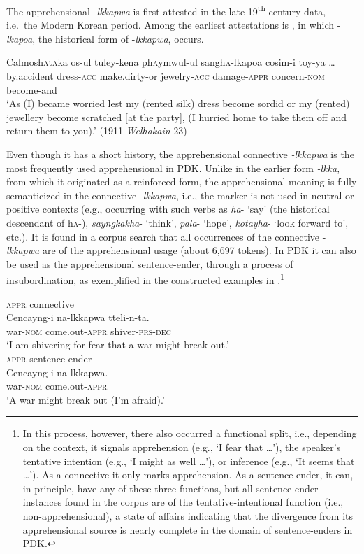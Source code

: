 \documentclass[output=paper,colorlinks,citecolor=brown]{langscibook}
\begin{document}
The apprehensional \textit{-lkkapwa} is first attested in the late 19\textsuperscript{th} century data, i.e.\  the Modern Korean period. Among the earliest attestations is , in which \nobreakdash-\textit{lkapoa}, the historical form of \nobreakdash-\textit{lkkapwa}, occurs.


\ea \label{ex:RK5}
\gll Calmosh\textsc{a}t\textsc{a}ka os-ul tuley-kena ph\textsc{a}ymwul-ul sangh\textsc{a}-lkapoa cosim-i toy-ya … \\
by.accident dress-\textsc{acc} make.dirty-or jewelry-\textsc{acc} damage-\textsc{appr} concern-\textsc{nom} become-and \\
\glt `As (I) became worried lest my (rented silk) dress become sordid or my (rented) jewellery become scratched [at the party], (I hurried home to take them off and return them to you).' (1911 \textit{Welhakain} 23)
\z


\noindent Even though it has a short history, the apprehensional connective \textit{-lkkapwa} is the most frequently used apprehensional in PDK. Unlike in the earlier form \textit{\nobreakdash-lkka}, from which it originated as a reinforced form, the apprehensional meaning is fully semanticized in the connective \nobreakdash-\textit{lkkapwa}, i.e., the marker is not used in neutral or positive contexts (e.g., occurring with such verbs as \textit{ha}- `say' (the historical descendant of h\textsc{a}-), \textit{sayngkakha}- `think', \textit{pala}- `hope', \textit{kotayha}- `look forward to', etc.). It is found in a corpus search that all occurrences of the connective \nobreakdash-\textit{lkkapwa} are of the apprehensional usage (about 6,697 tokens). In PDK it can also be used as the apprehensional sentence-ender, through a process of insubordination, as exemplified in the constructed examples in .\footnote{In this process, however, there also occurred a functional split, i.e., depending on the context, it signals apprehension (e.g., `I fear that …'), the speaker's tentative intention (e.g., `I might as well …'), or inference (e.g., `It seems that …'). As a connective it only marks apprehension. As a sentence-ender, it can, in principle, have any of these three functions, but all sentence-ender instances found in the corpus are of the tentative-intentional function (i.e., non-apprehensional), a state of affairs indicating that the divergence from its apprehensional source is nearly complete in the domain of sentence-enders in PDK.}


\ea \label{ex:RK6}
\ea \label{ex:RK6a} \textnormal{\textsc{appr} connective} \\
\gll Cencayng-i na-lkkapwa tteli-n-ta. \\
war-\textsc{nom} come.out-\textsc{appr} shiver-\textsc{prs-dec} \\
\glt `I am shivering for fear that a war might break out.' \\
\ex \label{ex:RK6b} \textnormal{\textsc{appr} sentence-ender} \\
\gll Cencayng-i na-lkkapwa. \\
war-\textsc{nom} come.out-\textsc{appr} \\
\glt `A war might break out (I'm afraid).'
\z
\z
\end{document}
